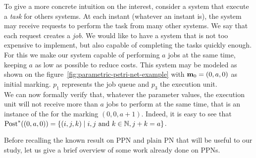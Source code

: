 To give a more concrete intuition on the interest, consider a system that execute a \emph{task} for others systems.
At each instant (whatever an instant is), the system may receive requests to perform the task from many other systems. We say that each request creates a \emph{job}.
We would like to have a system that is not too expensive to implement, but also capable of completing the tasks quickly enough.
For this we make our system capable of performing $a$ jobs at the same time, keeping $a$ as low as possible to reduce costs.
This system may be modeled as shown on the figure~\ref{fig:parametric-petri-net-example} with $\mathbf{m}_0 = (0, a, 0)$ as initial marking.
$p_1$ represents the job queue and $p_3$ the execution unit.\\
We can now formally verify that, whatever the parameter values, the execution unit will not receive more than $a$ jobs to perform at the same time, that is an instance of the \Ecov for the marking $(0, 0, a+1)$. Indeed, it is easy to see that $\operatorname{Post}^*((0, a, 0)) = \{(i, j, k) \mid i, j \text{ and } k \in \mathbb{N}, j + k = a\}$.

Before recalling the known result on \ac{PPN} and plain \ac{PN} that will be useful to our study, let us give a brief overview of some work already done on \acp{PPN}.

